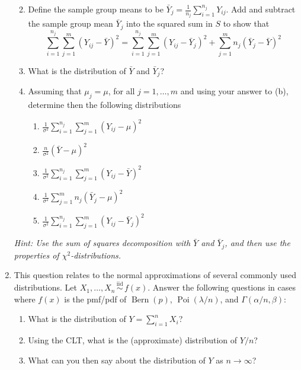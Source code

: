 \documentclass[
]{book}
\DeclareMathOperator{\Bern}{Bern}
\DeclareMathOperator{\Pois}{Poi}
\newcommand{\iid}{\,\overset{\text{iid}}{\sim}\,}
\theoremstyle{definition}
\theoremstyle{definition}
\theoremstyle{definition}
\theoremstyle{definition}
\theoremstyle{remark}
\begin{document}
\begin{enumerate}
  \begin{enumerate}
  \def\labelenumii{(\alph{enumii})}
  \item
    Define the sample group means to be \(\bar Y_j = \frac{1}{n_j}\sum_{i=1}^{n_j} Y_{ij}\). Add and subtract the sample group mean \(\bar Y_j\) into the squared sum in \(S\) to show that
    \[
     \sum_{i=1}^{n_j}\sum_{j=1}^m (Y_{ij} - \bar Y)^2 = \sum_{i=1}^{n_j}\sum_{j=1}^m (Y_{ij} - \bar Y_j)^2 + \sum_{j=1}^m n_j (\bar Y_j-\bar Y)^2
     \]
  \item
    What is the distribution of \(\bar Y\) and \(\bar Y_j\)?
  \item
    Assuming that \(\mu_j=\mu\), for all \(j=1,\dots,m\) and using your answer to (b), determine then the following distributions

    \begin{enumerate}
    \def\labelenumiii{\roman{enumiii}.}
    \item
      \(\frac{1}{\sigma^2}\sum_{i=1}^{n_j}\sum_{j=1}^m (Y_{ij} - \mu)^2\)
    \item
      \(\frac{n}{\sigma^2}(\bar Y - \mu)^2\)
    \item
      \(\frac{1}{\sigma^2}\sum_{i=1}^{n_j}\sum_{j=1}^m (Y_{ij} - \bar Y)^2\)
    \item
      \(\frac{1}{\sigma^2}\sum_{j=1}^m n_j (\bar Y_j-\mu)^2\)
    \item
      \(\frac{1}{\sigma^2}\sum_{i=1}^{n_j}\sum_{j=1}^m (Y_{ij} - \bar Y_j)^2\)
    \end{enumerate}
  \end{enumerate}

  \emph{Hint: Use the sum of squares decomposition with \(\bar Y\) and \(\bar Y_j\), and then use the properties of \(\chi^2\)-distributions.}
\item
  This question relates to the normal approximations of several commonly used distributions.
  Let \(X_1,\dots,X_n\iid f(x)\). Answer the following questions in cases where \(f(x)\) is the pmf/pdf of \(\Bern(p)\), \(\Pois(\lambda/n)\), and \(\Gamma(\alpha/n,\beta)\):

  \begin{enumerate}
  \def\labelenumii{(\alph{enumii})}
  \item
    What is the distribution of \(Y=\sum_{i=1}^n X_i\)?
  \item
    Using the CLT, what is the (approximate) distribution of \(Y/n\)?
  \item
    What can you then say about the distribution of \(Y\) as \(n\to\infty\)?
  \end{enumerate}
\end{enumerate}
\end{document}
